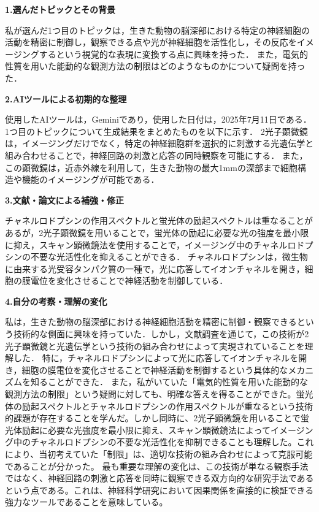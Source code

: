 \documentclass{classes/report}
\begin{document}

\newpage

\clearpage
\textbf{\large 1.選んだトピックとその背景}

私が選んだ1つ目のトピックは，生きた動物の脳深部における特定の神経細胞の活動を精密に制御し，観察できる点や光が神経細胞を活性化し，その反応をイメージングするという視覚的な表現に変換する点に興味を持った．
また，電気的性質を用いた能動的な観測方法の制限はどのようなものかについて疑問を持った．


\textbf{\large 2.AIツールによる初期的な整理}

使用したAIツールは，Geminiであり，使用した日付は，2025年7月11日である．1つ目のトピックについて生成結果をまとめたものを以下に示す．
2光子顕微鏡は，イメージングだけでなく，特定の神経細胞群を選択的に刺激する光遺伝学と組み合わせることで，神経回路の刺激と応答の同時観察を可能にする．
また，この顕微鏡は，近赤外線を利用して，生きた動物の最大1mmの深部まで細胞構造や機能のイメージングが可能である．

\textbf{\large 3.文献・論文による補強・修正}

チャネルロドプシンの作用スペクトルと蛍光体の励起スペクトルは重なることがあるが，2光子顕微鏡を用いることで，蛍光体の励起に必要な光の強度を最小限に抑え，スキャン顕微鏡法を使用することで，イメージング中のチャネルロドプシンの不要な光活性化を抑えることができる\cite{YIZHAR20119}．
チャネルロドプシンは，微生物に由来する光受容タンパク質の一種で，光に応答してイオンチャネルを開き，細胞の膜電位を変化させることで神経活動を制御している\cite{Xu02012020}．

\textbf{\large 4.自分の考察・理解の変化}

私は，生きた動物の脳深部における神経細胞活動を精密に制御・観察できるという技術的な側面に興味を持っていた．しかし，文献調査を通じて，この技術が2光子顕微鏡と光遺伝学という技術の組み合わせによって実現されていることを理解した．
特に，チャネルロドプシンによって光に応答してイオンチャネルを開き，細胞の膜電位を変化させることで神経活動を制御するという具体的なメカニズムを知ることができた．
また，私がいていた「電気的性質を用いた能動的な観測方法の制限」という疑問に対しても、明確な答えを得ることができた。蛍光体の励起スペクトルとチャネルロドプシンの作用スペクトルが重なるという技術的課題が存在することを学んだ。しかし同時に、2光子顕微鏡を用いることで蛍光体励起に必要な光強度を最小限に抑え、スキャン顕微鏡法によってイメージング中のチャネルロドプシンの不要な光活性化を抑制できることも理解した。これにより、当初考えていた「制限」は、適切な技術の組み合わせによって克服可能であることが分かった。
最も重要な理解の変化は、この技術が単なる観察手法ではなく、神経回路の刺激と応答を同時に観察できる双方向的な研究手法であるという点である。これは、神経科学研究において因果関係を直接的に検証できる強力なツールであることを意味している。
\end{document}
